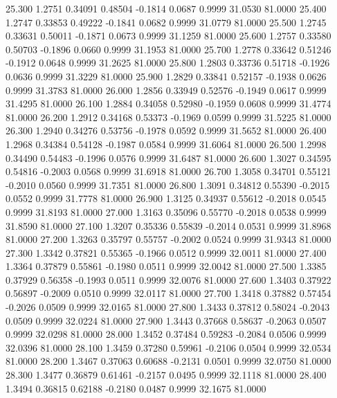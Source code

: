   25.300   1.2751   0.34091   0.48504  -0.1814   0.0687   0.9999  31.0530  81.0000
  25.400   1.2747   0.33853   0.49222  -0.1841   0.0682   0.9999  31.0779  81.0000
  25.500   1.2745   0.33631   0.50011  -0.1871   0.0673   0.9999  31.1259  81.0000
  25.600   1.2757   0.33580   0.50703  -0.1896   0.0660   0.9999  31.1953  81.0000
  25.700   1.2778   0.33642   0.51246  -0.1912   0.0648   0.9999  31.2625  81.0000
  25.800   1.2803   0.33736   0.51718  -0.1926   0.0636   0.9999  31.3229  81.0000
  25.900   1.2829   0.33841   0.52157  -0.1938   0.0626   0.9999  31.3783  81.0000
  26.000   1.2856   0.33949   0.52576  -0.1949   0.0617   0.9999  31.4295  81.0000
  26.100   1.2884   0.34058   0.52980  -0.1959   0.0608   0.9999  31.4774  81.0000
  26.200   1.2912   0.34168   0.53373  -0.1969   0.0599   0.9999  31.5225  81.0000
  26.300   1.2940   0.34276   0.53756  -0.1978   0.0592   0.9999  31.5652  81.0000
  26.400   1.2968   0.34384   0.54128  -0.1987   0.0584   0.9999  31.6064  81.0000
  26.500   1.2998   0.34490   0.54483  -0.1996   0.0576   0.9999  31.6487  81.0000
  26.600   1.3027   0.34595   0.54816  -0.2003   0.0568   0.9999  31.6918  81.0000
  26.700   1.3058   0.34701   0.55121  -0.2010   0.0560   0.9999  31.7351  81.0000
  26.800   1.3091   0.34812   0.55390  -0.2015   0.0552   0.9999  31.7778  81.0000
  26.900   1.3125   0.34937   0.55612  -0.2018   0.0545   0.9999  31.8193  81.0000
  27.000   1.3163   0.35096   0.55770  -0.2018   0.0538   0.9999  31.8590  81.0000
  27.100   1.3207   0.35336   0.55839  -0.2014   0.0531   0.9999  31.8968  81.0000
  27.200   1.3263   0.35797   0.55757  -0.2002   0.0524   0.9999  31.9343  81.0000
  27.300   1.3342   0.37821   0.55365  -0.1966   0.0512   0.9999  32.0011  81.0000
  27.400   1.3364   0.37879   0.55861  -0.1980   0.0511   0.9999  32.0042  81.0000
  27.500   1.3385   0.37929   0.56358  -0.1993   0.0511   0.9999  32.0076  81.0000
  27.600   1.3403   0.37922   0.56897  -0.2009   0.0510   0.9999  32.0117  81.0000
  27.700   1.3418   0.37882   0.57454  -0.2026   0.0509   0.9999  32.0165  81.0000
  27.800   1.3433   0.37812   0.58024  -0.2043   0.0509   0.9999  32.0224  81.0000
  27.900   1.3443   0.37668   0.58637  -0.2063   0.0507   0.9999  32.0298  81.0000
  28.000   1.3452   0.37484   0.59283  -0.2084   0.0506   0.9999  32.0396  81.0000
  28.100   1.3459   0.37280   0.59961  -0.2106   0.0504   0.9999  32.0534  81.0000
  28.200   1.3467   0.37063   0.60688  -0.2131   0.0501   0.9999  32.0750  81.0000
  28.300   1.3477   0.36879   0.61461  -0.2157   0.0495   0.9999  32.1118  81.0000
  28.400   1.3494   0.36815   0.62188  -0.2180   0.0487   0.9999  32.1675  81.0000
